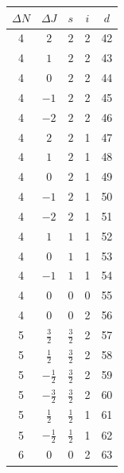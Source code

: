 \documentclass{article}
\begin{document}
       \begin{tabular}{|c|c|c|c|c|}
       \hline
           $\Delta N$ &$\Delta J$& $s$ &$i$&$d$ \\ \hline         
           4 & $2$& $2$&2&42 \\\hline            
           4 & $1$& $2$&2&43 \\\hline            
           4 & $0$& $2$&2&44 \\\hline            
           4 & $-1$& $2$&2&45 \\\hline            
           4 & $-2$& $2$&2&46 \\\hline            
           4 & $2$& $2$&1&47 \\\hline            
           4 & $1$& $2$&1&48 \\\hline            
           4 & $0$& $2$&1&49 \\\hline            
           4 & $-1$& $2$&1&50 \\\hline            
           4 & $-2$& $2$&1&51 \\\hline           
           4 & $1$& $1$&1&52 \\\hline         
           4 & $0$& $1$&1&53 \\\hline         
           4 & $-1$& $1$&1&54 \\\hline         
           4 & $0$& $0$&0&55 \\\hline        
           4 & $0$& $0$&2&56 \\\hline     
           5 & $\frac{3}{2}$& $\frac{3}{2}$&2&57 \\\hline
           5 & $\frac{1}{2}$& $\frac{3}{2}$&2&58 \\\hline
           5 & $-\frac{1}{2}$& $\frac{3}{2}$&2&59 \\\hline
           5 & $-\frac{3}{2}$& $\frac{3}{2}$&2&60 \\\hline           
           5 & $\frac{1}{2}$& $\frac{1}{2}$&1&61 \\\hline               
           5 & $-\frac{1}{2}$& $\frac{1}{2}$&1&62 \\\hline   
           6 & 0& 0&2&63 \\\hline
       \end{tabular}
\end{document}
